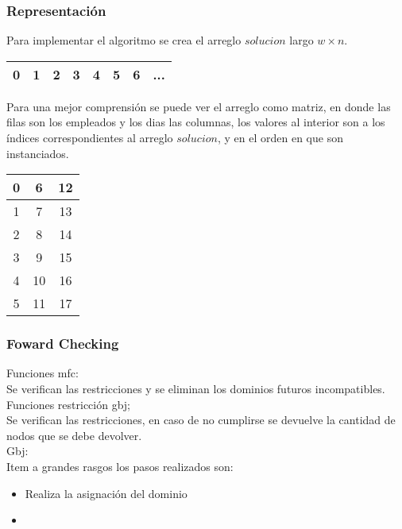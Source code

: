 \frame
{
\frametitle{Representación}
Para implementar el algoritmo se crea el arreglo $solucion$ largo $w \times n$.\\
\begin{table}[H]
\begin{center}
\begin{tabular}{|c|c|c|c|c|c|c|c|}
\hline  0& 1 & 2&3&4&5&6&...  \\ 
\hline 
\end{tabular} 
\end{center}
\end{table}

Para una mejor comprensión se puede ver el arreglo como matriz, en donde las filas son los empleados y los dias las columnas, los valores al interior son a los índices correspondientes al arreglo $solucion$, y en el orden en que son instanciados.
\begin{table}[H]
\begin{center}
\begin{tabular}{|c|c|c|}
\hline  0& 6 & 12  \\ 
\hline  1& 7& 13 \\ 
\hline  2& 8 & 14  \\ 
\hline  3&9 & 15\\ 
\hline  4& 10 & 16  \\ 
\hline  5& 11& 17  \\ 
\hline 
\end{tabular} 
\end{center}
\end{table}
}
\frame
{
\frametitle{Foward Checking}
Funciones mfc:\\
Se verifican las restricciones y se eliminan los dominios futuros incompatibles.
Funciones restricción gbj;\\
Se verifican las restricciones, en caso de no cumplirse se devuelve la cantidad de nodos que se debe devolver.\\
Gbj:\\
Item a grandes rasgos los pasos realizados son:
\begin{itemize}
\item Realiza la asignación del dominio
\item 
\end{itemize}

}
